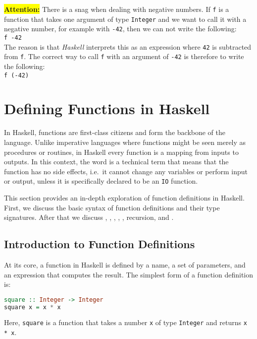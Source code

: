 \noindent
\colorbox{yellow}{\textbf{Attention:}}  There is a snag when dealing with negative numbers.  If \texttt{f} is a function that
takes one argument of type \texttt{Integer} and we want to call it with a negative number, for example with
\texttt{-42}, then we can not write the following:
\\[0.2cm]
\hspace*{1.3cm}
\texttt{f -42}
\\[0.2cm]
The reason is that \textsl{Haskell} interprets this as an expression where \texttt{42} is subtracted from
\texttt{f}.  The correct way to call \texttt{f} with an argument of \texttt{-42} is therefore to write the following:
\\[0.2cm]
\hspace*{1.3cm}
\texttt{f (-42)}


\section{Defining Functions in Haskell}
In Haskell, functions are first-class citizens and form the backbone of the language. Unlike imperative
languages where functions might be seen merely as procedures or routines, in Haskell every function is a 
mapping from inputs to outputs.  In this context, the word  is a technical term that means that the
function has no side effects, i.e.~it cannot change any variables or perform input or output, unless it is
specifically declared to be an \texttt{IO} function.

This section provides an in-depth exploration of function definitions in
Haskell. First, we discuss the basic syntax of function definitions and their type signatures. After that we discuss
, , , , ,
recursion, and . 


\subsection{Introduction to Function Definitions}
At its core, a function in Haskell is defined by a name, a set of parameters, and an expression that computes the result. The simplest form of a function definition is:
\begin{lstlisting}[style=haskellstyle, language=Haskell]
square :: Integer -> Integer
square x = x * x
\end{lstlisting}
Here, \texttt{square} is a function that takes a number \texttt{x} of type \texttt{Integer} and returns
\texttt{x * x}. 


